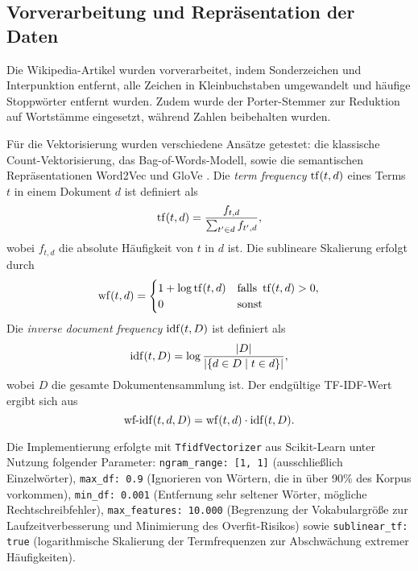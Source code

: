\subsection{Vorverarbeitung und Repräsentation der Daten}
\label{sec:vorverarbeitung}

Die Wikipedia-Artikel wurden vorverarbeitet, indem Sonderzeichen und Interpunktion entfernt, alle Zeichen in Kleinbuchstaben umgewandelt und häufige Stoppwörter entfernt wurden. Zudem wurde der Porter-Stemmer \cite{Porter2006} zur Reduktion auf Wortstämme eingesetzt, während Zahlen beibehalten wurden.

Für die Vektorisierung wurden verschiedene Ansätze getestet: die klassische Count-Vektorisierung, das Bag-of-Words-Modell, sowie die semantischen Repräsentationen Word2Vec \cite{Mikolov2013} und GloVe \cite{Pennington2014}. Die \textit{term frequency} $\operatorname{tf}(t, d)$ eines Terms $t$ in einem Dokument $d$ ist definiert als
\begin{equation*}
    \operatorname{tf}(t, d) = \frac{f_{t, d}}{\sum_{t'\in d}f_{t', d}},
\end{equation*}
wobei $f_{t, d}$ die absolute Häufigkeit von $t$ in $d$ ist. Die sublineare Skalierung erfolgt durch
\begin{equation*}
    \operatorname{wf}(t, d) = \begin{cases}
        1 + \log \operatorname{tf}(t, d) &\text{falls } \operatorname{tf}(t, d) > 0,\\
        0 &\text{sonst}
    \end{cases}
\end{equation*}
Die \textit{inverse document frequency} $\operatorname{idf}(t, D)$ ist definiert als
\begin{equation*}
    \operatorname{idf}(t, D) = \log\frac{\vert D\vert}{\vert\{d\in D \mid t\in d\}\vert},
\end{equation*}
wobei $D$ die gesamte Dokumentensammlung ist. Der endgültige TF-IDF-Wert ergibt sich aus
\begin{equation*}
    \operatorname{wf-idf}(t, d, D) = \operatorname{wf}(t, d)\cdot \operatorname{idf}(t, D).
\end{equation*}

Die Implementierung erfolgte mit \texttt{TfidfVectorizer} aus Scikit-Learn \cite{Pedregosa2011} unter Nutzung folgender Parameter: \texttt{ngram\_range: [1, 1]} (ausschließlich Einzelwörter), \texttt{max\_df: 0.9} (Ignorieren von Wörtern, die in über 90\% des Korpus vorkommen), \texttt{min\_df: 0.001} (Entfernung sehr seltener Wörter, mögliche Rechtschreibfehler), \texttt{max\_features: 10.000} (Begrenzung der Vokabulargröße zur Laufzeitverbesserung und Minimierung des Overfit-Risikos) sowie \texttt{sublinear\_tf: true} (logarithmische Skalierung der Termfrequenzen zur Abschwächung extremer Häufigkeiten).